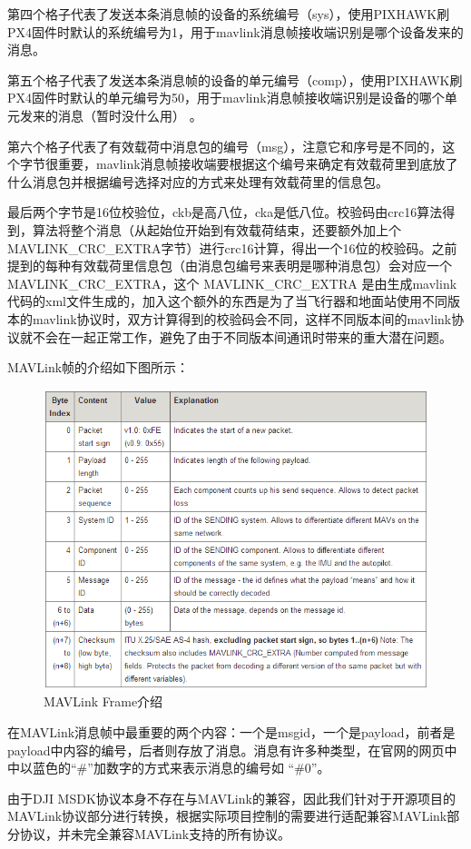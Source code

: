 第四个格子代表了发送本条消息帧的设备的系统编号（sys），使用PIXHAWK刷PX4固件时默认的系统编号为1，用于mavlink消息帧接收端识别是哪个设备发来的消息。

第五个格子代表了发送本条消息帧的设备的单元编号（comp），使用PIXHAWK刷PX4固件时默认的单元编号为50，用于mavlink消息帧接收端识别是设备的哪个单元发来的消息（暂时没什么用） 。

第六个格子代表了有效载荷中消息包的编号（msg），注意它和序号是不同的，这个字节很重要，mavlink消息帧接收端要根据这个编号来确定有效载荷里到底放了什么消息包并根据编号选择对应的方式来处理有效载荷里的信息包。

最后两个字节是16位校验位，ckb是高八位，cka是低八位。校验码由crc16算法得到，算法将整个消息（从起始位开始到有效载荷结束，还要额外加上个MAVLINK_CRC_EXTRA字节）进行crc16计算，得出一个16位的校验码。之前提到的每种有效载荷里信息包（由消息包编号来表明是哪种消息包）会对应一个MAVLINK_CRC_EXTRA，这个 MAVLINK_CRC_EXTRA 是由生成mavlink代码的xml文件生成的，加入这个额外的东西是为了当飞行器和地面站使用不同版本的mavlink协议时，双方计算得到的校验码会不同，这样不同版本间的mavlink协议就不会在一起正常工作，避免了由于不同版本间通讯时带来的重大潜在问题。

MAVLink帧的介绍如下图所示：

\begin{figure}[ht]
  \centering
  \includegraphics[width=0.8\linewidth]{./Figure/Mavlink_Frame_Intro.png}
  \caption{MAVLink Frame介绍}\label{Fig:xd1}
\end{figure}

在MAVLink消息帧中最重要的两个内容：一个是msgid，一个是payload，前者是payload中内容的编号，后者则存放了消息。消息有许多种类型，在官网的网页中中以蓝色的“\#”加数字的方式来表示消息的编号如 “\#0”。

由于DJI MSDK协议本身不存在与MAVLink的兼容，因此我们针对于开源项目的MAVLink协议部分进行转换，根据实际项目控制的需要进行适配兼容MAVLink部分协议，并未完全兼容MAVLink支持的所有协议。

